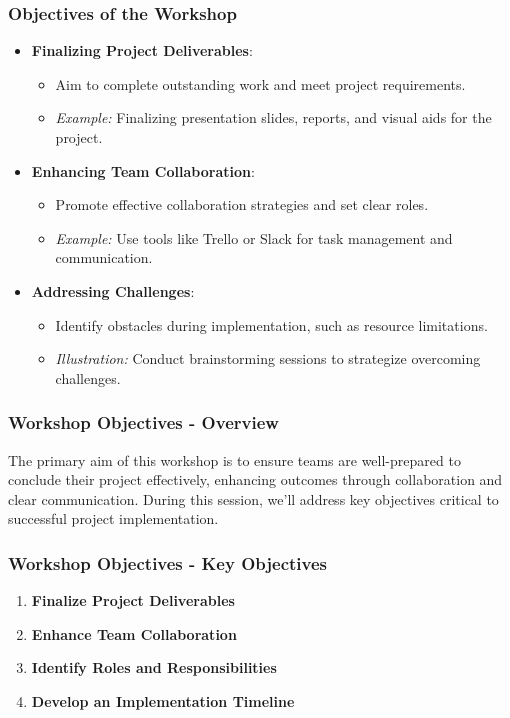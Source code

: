 \documentclass{beamer}
\begin{document}
\begin{frame}[fragile]
    \frametitle{Objectives of the Workshop}
    \begin{itemize}
        \item \textbf{Finalizing Project Deliverables}:
        \begin{itemize}
            \item Aim to complete outstanding work and meet project requirements.
            \item \textit{Example:} Finalizing presentation slides, reports, and visual aids for the project.
        \end{itemize}

        \item \textbf{Enhancing Team Collaboration}:
        \begin{itemize}
            \item Promote effective collaboration strategies and set clear roles.
            \item \textit{Example:} Use tools like Trello or Slack for task management and communication.
        \end{itemize}

        \item \textbf{Addressing Challenges}:
        \begin{itemize}
            \item Identify obstacles during implementation, such as resource limitations.
            \item \textit{Illustration:} Conduct brainstorming sessions to strategize overcoming challenges.
        \end{itemize}
    \end{itemize}
\end{frame}

\begin{frame}[fragile]
    \frametitle{Workshop Objectives - Overview}
    The primary aim of this workshop is to ensure teams are well-prepared to conclude their project effectively, enhancing outcomes through collaboration and clear communication. 
    During this session, we'll address key objectives critical to successful project implementation.
\end{frame}

\begin{frame}[fragile]
    \frametitle{Workshop Objectives - Key Objectives}
    \begin{enumerate}
        \item \textbf{Finalize Project Deliverables}
        \item \textbf{Enhance Team Collaboration}
        \item \textbf{Identify Roles and Responsibilities}
        \item \textbf{Develop an Implementation Timeline}
    \end{enumerate}
\end{frame}
\end{document}
